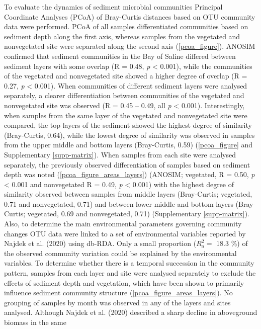 \documentclass[12pt,]{article}
\begin{document}
To evaluate the dynamics of sediment microbial communities Principal
Coordinate Analyses (PCoA) of Bray-Curtis distances based on OTU
community data were performed. PCoA of all samples differentiated
communities based on sediment depth along the first axis, whereas
samples from the vegetated and nonvegetated site were separated along
the second axis (\autoref{pcoa_figure}). ANOSIM confirmed that sediment
communities in the Bay of Saline differed between sediment layers with
some overlap (R = 0.48, \emph{p} \textless{} 0.001), while the
communities of the vegetated and nonvegetated site showed a higher
degree of overlap (R = 0.27, \emph{p} \textless{} 0.001). When
communities of different sediment layers were analysed separately, a
clearer differentiation between communities of the vegetated and
nonvegetated site was observed (R = 0.45 -- 0.49, all \emph{p}
\textless{} 0.001). Interestingly, when samples from the same layer of
the vegetated and nonvegetated site were compared, the top layers of the
sediment showed the highest degree of similarity (Bray-Curtis, 0.64),
while the lowest degree of similarity was observed in samples from the
upper middle and bottom layers (Bray-Curtis, 0.59)
(\autoref{pcoa_figure} and Supplementary \autoref{supp-matrix}). When
samples from each site were analysed separately, the previously observed
differentiation of samples based on sediment depth was noted
(\autoref{pcoa_figure_areas_layers}) (ANOSIM; vegetated, R = 0.50,
\emph{p} \textless{} 0.001 and nonvegetated R = 0.49, \emph{p}
\textless{} 0.001) with the highest degree of similarity observed
between samples from middle layers (Bray-Curtis; vegetated, 0.71 and
nonvegetated, 0.71) and between lower middle and bottom layers
(Bray-Curtis; vegetated, 0.69 and nonvegetated, 0.71) (Supplementary
\autoref{supp-matrix}). Also, to determine the main environmental
parameters governing community changes OTU data were linked to a set of
environmental variables reported by Najdek et al. (2020) using db-RDA.
Only a small proportion (\(R^2_a=\) 18.3 \si{\percent}) of the observed
community variation could be explained by the environmental variables.
To determine whether there is a temporal succession in the community
pattern, samples from each layer and site were analysed separately to
exclude the effects of sediment depth and vegetation, which have been
shown to primarily influence sediment community structure
(\autoref{pcoa_figure_areas_layers}). No grouping of samples by month
was observed in any of the layers and sites analysed. Although Najdek et
al. (2020) described a sharp decline in aboveground biomass in the same
\end{document}
